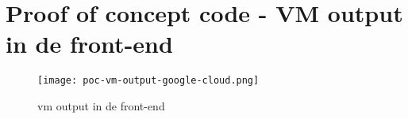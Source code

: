 \section{Proof of concept code - VM output in de front-end}\label{appendix:poc-vm-output-google-cloud}
\begin{figure}[hbt!]
  \centering
  \texttt{[image: poc-vm-output-google-cloud.png]}
  \caption{\Acrfull{vm} output in de front-end}
  \label{fig:poc-vm-output-google-cloud}
\end{figure}

\newpage
